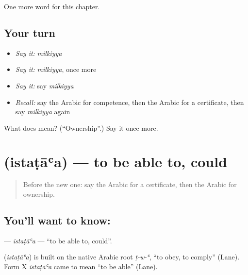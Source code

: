 \begin{grammarlens}[title={What you've built}]
One more word for this chapter.
\end{grammarlens}

\subsection*{Your turn}
\begin{itemize}
\raggedright
  \item \emph{Say it:} \emph{milkiyya}
  \item \emph{Say it:} \emph{milkiyya}, once more
  \item \emph{Say it:} say \emph{milkiyya}
  \item \emph{Recall:} say the Arabic for competence, then the Arabic for a certificate, then say \emph{milkiyya} again
\end{itemize}

\begin{tcolorbox}[breakable,colback=teal!4,colframe=teal!35!black,title={Before you move on}]
What does  mean? (\textquotedblleft{}Ownership\textquotedblright{}.) Say it once more.
\end{tcolorbox}
\section[\texorpdfstring{\ar{استطاع} (istaṭāʿa)}{استطاع (istaṭāʿa)}]{ (istaṭāʿa) — to be able to, could}

\label{lesson:AR-C107-istataa}



\begin{quote}
Before the new one: say the Arabic for a certificate, then the Arabic for ownership.
\end{quote}

\subsection*{You'll want to know: }
\textbf{} — \emph{istaṭāʿa} — \textquotedblleft{}to be able to, could\textquotedblright{}.

\begin{cousinweb}
\textbf{} (\emph{istaṭāʿa}) is built on the native Arabic root \emph{ṭ-w-ʿ}, \textquotedblleft{}to obey, to comply\textquotedblright{} (Lane). Form X \emph{istaṭāʿa} came to mean \textquotedblleft{}to be able\textquotedblright{} (Lane).
\end{cousinweb}

